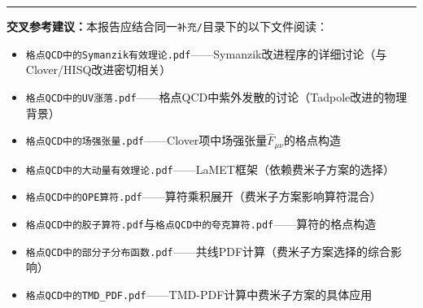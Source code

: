 \documentclass[12pt,a4paper]{ctexart}
\theoremstyle{definition}
\begin{document}
\vspace{0.5cm}
\noindent\rule{\textwidth}{0.5pt}
\small
\textbf{交叉参考建议：}本报告应结合同一\texttt{补充/}目录下的以下文件阅读：
\begin{itemize}[nosep]
    \item \texttt{格点QCD中的Symanzik有效理论.pdf}——Symanzik改进程序的详细讨论（与Clover/HISQ改进密切相关）
    \item \texttt{格点QCD中的UV涨落.pdf}——格点QCD中紫外发散的讨论（Tadpole改进的物理背景）
    \item \texttt{格点QCD中的场强张量.pdf}——Clover项中场强张量$\hat F_{\mu\nu}$的格点构造
    \item \texttt{格点QCD中的大动量有效理论.pdf}——LaMET框架（依赖费米子方案的选择）
    \item \texttt{格点QCD中的OPE算符.pdf}——算符乘积展开（费米子方案影响算符混合）
    \item \texttt{格点QCD中的胶子算符.pdf}与\texttt{格点QCD中的夸克算符.pdf}——算符的格点构造
    \item \texttt{格点QCD中的部分子分布函数.pdf}——共线PDF计算（费米子方案选择的综合影响）
    \item \texttt{格点QCD中的TMD\_PDF.pdf}——TMD-PDF计算中费米子方案的具体应用
\end{itemize}
\end{document}
